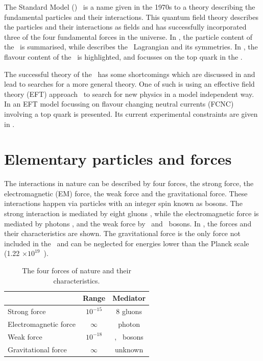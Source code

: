 The Standard Model (\SM)~\cite{Peskin:257493} 
is a name given in the 1970s to a theory describing the fundamental particles and their interactions. This quantum field theory describes the particles and their interactions as fields and has successfully incorporated three of the four fundamental forces in the universe. In , the particle content of the \SM\ is summarised, while  describes  the \SM\ Lagrangian and its symmetries. In , the flavour content of the \SM\ is highlighted, and  focusses on the top quark in the \SM. 

The successful theory of the \SM\ has some shortcomings which are discussed in  and lead to searches for a more general theory. One of such  is using  an effective field theory (EFT) approach~\cite{Burgess:2007pt}  to search for new physics in a model independent way. In  an EFT model focussing on flavour changing neutral currents (FCNC) involving a top quark is presented. Its current experimental constraints are given in .



\section{Elementary particles and forces}
\label{sec:SMcontent}
The interactions in nature can be described by four forces, the strong force, the electromagnetic (EM) force, the weak force and the gravitational force. These interactions happen via particles with an integer spin known as bosons. The strong interaction is mediated by eight gluons \Pgluon, while the electromagnetic force is mediated by photons \Pphoton, and the weak force by \PZ\ and \PWpm\ bosons. In , the forces and their characteristics are shown. The gravitational force is the only force not included in the \SM\ and can be neglected for energies lower than the Planck scale (1.22 $\times 10^{19}$~\GeV).
\begin{table}[htbp]
	\centering
	\caption{The four forces of nature and their characteristics.}
	\begin{tabular}{lcc}
		\toprule
		& Range & Mediator \\ 
		\midrule
		Strong force & $10^{-15}$ \m & 8 gluons  \\ 
	
		Electromagnetic force & $\infty$ & photon  \\ 
		 
		Weak force & $10^{-18}$ \m & \PWpm, \PZ\ bosons \\ 
		
		Gravitational force & $\infty$ & unknown \\ 
		\bottomrule
	\end{tabular} 
	\label{tab:forces}
\end{table}

